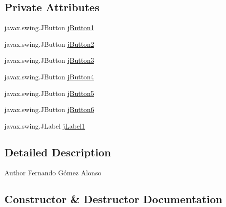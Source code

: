 \subsection*{Private Attributes}
\begin{DoxyCompactItemize}
\item 
javax.\+swing.\+J\+Button \mbox{\hyperlink{class_interfaz_package_1_1_interfaz_admin_a9105aba7ae58736d959752db09b708a7}{j\+Button1}}
\item 
javax.\+swing.\+J\+Button \mbox{\hyperlink{class_interfaz_package_1_1_interfaz_admin_acc936e9e831e0d280f8bd3d6215d69d1}{j\+Button2}}
\item 
javax.\+swing.\+J\+Button \mbox{\hyperlink{class_interfaz_package_1_1_interfaz_admin_a1c49c5af96e421af2c0e3e773995db35}{j\+Button3}}
\item 
javax.\+swing.\+J\+Button \mbox{\hyperlink{class_interfaz_package_1_1_interfaz_admin_abe45cfffa25b1f68f153eb8dfed74132}{j\+Button4}}
\item 
javax.\+swing.\+J\+Button \mbox{\hyperlink{class_interfaz_package_1_1_interfaz_admin_a158621407bca85eb067b4d84fb15f8f8}{j\+Button5}}
\item 
javax.\+swing.\+J\+Button \mbox{\hyperlink{class_interfaz_package_1_1_interfaz_admin_aed43fc05f792f94859d625d8c69e9858}{j\+Button6}}
\item 
javax.\+swing.\+J\+Label \mbox{\hyperlink{class_interfaz_package_1_1_interfaz_admin_a616ba73f041fc46fb10107d67b98f5ad}{j\+Label1}}
\end{DoxyCompactItemize}


\subsection{Detailed Description}
\begin{DoxyAuthor}{Author}
Fernando Gómez Alonso 
\end{DoxyAuthor}


\subsection{Constructor \& Destructor Documentation}
\mbox{\label{class_interfaz_package_1_1_interfaz_admin_a314844323c7cc2133f2e6e27e437f3c7}} 
